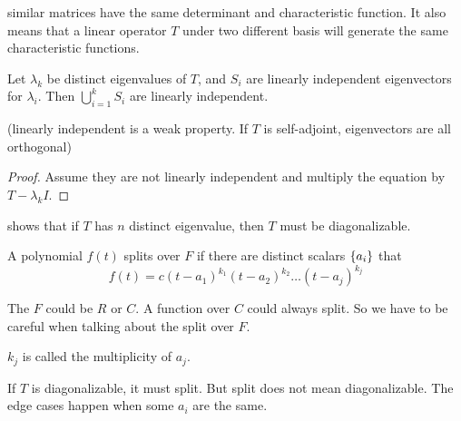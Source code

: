 \begin{theorem}
    similar matrices have the same determinant and characteristic function. It also means that a linear operator $T$ under two different basis will generate the same characteristic functions.
\end{theorem}


\begin{theorem}\label{eigenvector_sets_are_linearly_independent}
    Let $\lambda_k$ be distinct eigenvalues of $T$, and $S_i$ are linearly independent eigenvectors for $\lambda_i$. Then $\bigcup_{i=1}^k S_i$ are linearly independent.
    
    (linearly independent is a weak property. If $T$ is self-adjoint, eigenvectors are all orthogonal)
\end{theorem}
\begin{proof}
    Assume they are not linearly independent and multiply the equation by $T - \lambda_k I$.
\end{proof}

 shows that if $T$ has $n$ distinct eigenvalue, then $T$ must be diagonalizable.

\begin{definition}
    A polynomial $f(t)$ splits over $F$ if there are distinct scalars $\set{a_i}$ that
    \begin{equation}
        f(t) = c (t - a_1)^{k_1} (t - a_2)^{k_2} \hdots (t - a_j)^{k_j}
    \end{equation}
    
    The $F$ could be $R$ or $C$. A function over $C$ could always split. So we have to be careful when talking about the split over $F$.
    
    $k_j$ is called the multiplicity of $a_j$.
\end{definition}

If $T$ is diagonalizable, it must split. But split does not mean diagonalizable. The edge cases happen when some $a_i$ are the same.


